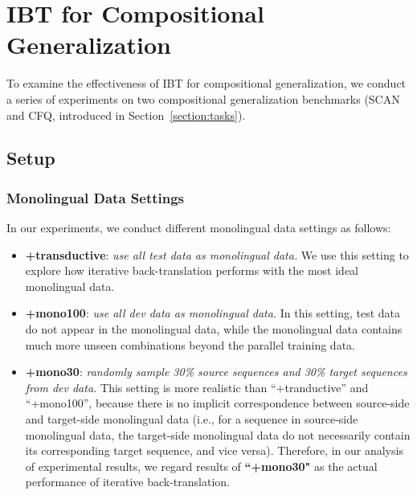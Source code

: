 \documentclass[letterpaper]{article} %
\begin{document}
\section{IBT for Compositional Generalization}
\label{section:c1}

To examine the effectiveness of IBT for compositional generalization, we conduct a series of experiments on two compositional generalization benchmarks (SCAN and CFQ, introduced in Section~\ref{section:tasks}).

\subsection{Setup}
\label{sec:ibt_setup}
\subsubsection{Monolingual Data Settings}
In our experiments, we conduct different monolingual data settings as follows:
\begin{itemize}
    \item \textbf{+transductive}:
    \emph{use all test data as monolingual data.}
    We use this setting to explore how iterative back-translation performs with the most ideal monolingual data.
    \item \textbf{+mono100}:
    \emph{use all dev data as monolingual data.}
    In this setting, test data do not appear in the monolingual data, while the monolingual data contains much more unseen combinations beyond the parallel training data.
    \item \textbf{+mono30}:
    \emph{randomly sample 30\% source sequences and 30\% target sequences from dev data.}
    This setting is more realistic than ``+tranductive'' and ``+mono100'', because there is no implicit correspondence between source-side and target-side monolingual data (i.e., for a sequence in source-side monolingual data, the target-side monolingual data do not necessarily contain its corresponding target sequence, and vice versa).
    Therefore, in our analysis of experimental results, we regard results of \textbf{``+mono30"} as the actual performance of iterative back-translation.
\end{itemize}
\end{document}

